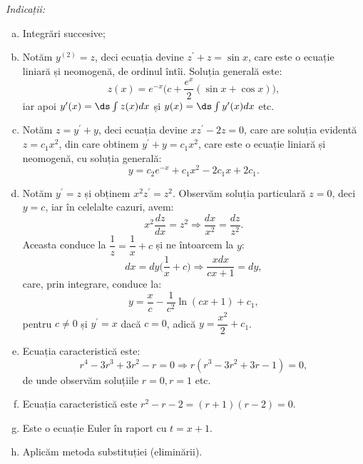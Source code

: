 \emph{Indicații:}
\begin{enumerate}[(a)]
  \item Integrări succesive;
  \item Notăm $ y^{(2)} = z $, deci ecuația devine $ z^\prime + z = \sin x $, care este
    o ecuație liniară și neomogenă, de ordinul întîi. Soluția generală este:
    \[
      z(x) = e^{-x}\Big( c + \dfrac{e^x}{2} (\sin x + \cos x) \Big),
    \]
    iar apoi $ y^\prime(x) = \ds\int z(x) dx $ și $ y(x) = \ds\int y^\prime (x) dx $ etc.
  \item Notăm $ z = y^\prime + y $, deci ecuația devine $ xz^\prime - 2z = 0 $, care
    are soluția evidentă $ z = c_1 x^2 $, din care obtinem $ y^\prime + y = c_1 x^2 $, care
    este o ecuație liniară și neomogenă, cu soluția generală:
    \[
      y = c_2 e^{-x} + c_1 x^2 - 2c_1 x + 2c_1.
    \]
  \item Notăm $ y^\prime = z $ și obținem $ x^2 z^\prime = z^2 $. Observăm soluția particulară
    $ z = 0 $, deci $ y = c $, iar în celelalte cazuri, avem:
    \[
      x^2 \dfrac{dz}{dx} = z^2 \Rightarrow \dfrac{dx}{x^2} = \dfrac{dz}{z^2}.
    \]
    Aceasta conduce la $ \dfrac{1}{z} = \dfrac{1}{x} + c $ și ne întoarcem
    la $ y $:
    \[
      dx = dy \Big( \dfrac{1}{x} + c \Big) \Rightarrow \dfrac{xdx}{cx + 1} = dy,
    \]
    care, prin integrare, conduce la:
    \[
      y = \dfrac{x}{c} - \dfrac{1}{c^2} \ln(cx + 1) + c_1,
    \]
    pentru $ c \neq 0 $ și $ y^\prime = x $ dacă $ c = 0 $, adică $ y = \dfrac{x^2}{2} + c_1 $.
  \item Ecuația caracteristică este:
    \[
      r^4 - 3r^3 + 3r^2 - r = 0 \Rightarrow r(r^3 - 3r^2 + 3r - 1) = 0,
    \]
    de unde observăm soluțiile $ r = 0, r = 1 $ etc.
  \item Ecuația caracteristică este $ r^2 - r - 2 = (r + 1)(r - 2) = 0 $.
  \item Este o ecuație Euler în raport cu $ t = x + 1 $.
  \item Aplicăm metoda substituției (eliminării).
\end{enumerate}


